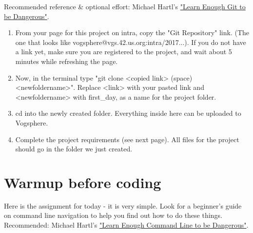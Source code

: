 \documentclass{42-en}
\begin{document}
Recommended reference \& optional effort: Michael Hartl's \href{https://www.learnenough.com/git-tutorial}{"Learn Enough Git to be Dangerous"}.

\begin{enumerate}

\item From your page for this project on intra, copy the "Git Repository" link. (The one that looks like vogsphere@vgs.42.us.org:intra/2017...). If you do not have a link yet, make sure you are registered to the project, and wait about 5 minutes while refreshing the page.

\item Now, in the terminal type "git clone <copied link> (space) <newfoldername>". Replace <link> with your pasted link and <newfoldername> with first\_day, as a name for the project folder.

\item cd into the newly created folder. Everything inside here can be uploaded to Vogsphere.

\item Complete the project requirements (see next page). All files for the project should go in the folder we just created.

\end{enumerate}



\chapter{Warmup before coding}

\makeheaderfiles

Here is the assignment for today - it is very simple. Look for a beginner's guide on command line navigation to help you find out how to do these things. Recommended: Michael Hartl's \href{https://www.learnenough.com/command-line-tutorial}{"Learn Enough Command Line to be Dangerous"}.
\end{document}
